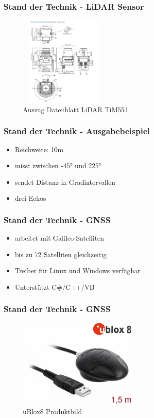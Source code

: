 \documentclass{beamer}
\begin{document}
\begin{frame}
\frametitle{Stand der Technik - LiDAR Sensor}
	\begin{figure}[h!]
  		\caption{Auszug Datenblatt LiDAR TiM551}
		\includegraphics[width = 170px, height = 170px]{LidarTim551Drawing.PNG}	
	\end{figure}
\end{frame}

\begin{frame}
\frametitle{Stand der Technik - Ausgabebeispiel}
\begin{itemize}
\item<1-> Reichweite: 10m 
\item<2-> misst zwischen -45° und 225°
\item<3-> sendet Distanz in Gradintervallen
\item<4> drei Echos
\end{itemize}
\end{frame}

\begin{frame}
\frametitle{Stand der Technik - GNSS}
\begin{itemize}
\item<1-> arbeitet mit Galileo-Satelliten
\item<2-> bis zu 72 Satelliten gleichzeitig
\item<3-> Treiber für Linux und Windows verfügbar
\item<4> Unterstützt C\#/C++/VB
\end{itemize}
\end{frame}

\begin{frame}
\frametitle{Stand der Technik - GNSS}
	\begin{figure}[h!]
  		\caption{uBlox8 Produktbild}
		\includegraphics[width = 230px, height = 170px]{uBlox8.jpg}	
	\end{figure}
\end{frame}
\end{document}
